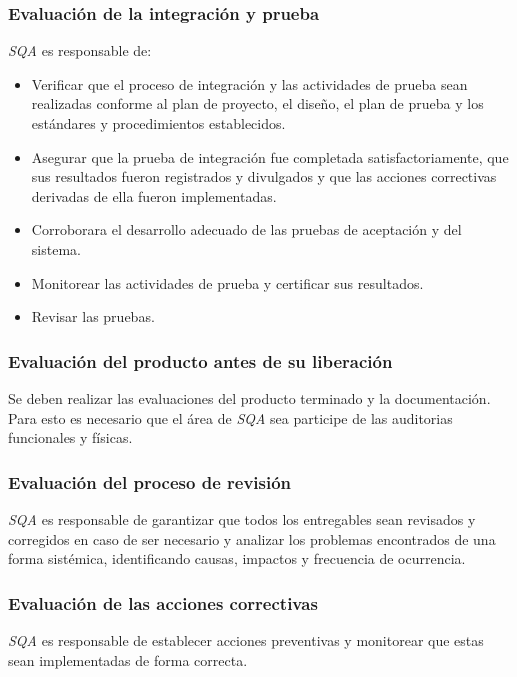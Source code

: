 \subsubsection{Evaluación de la integración y prueba}

\emph{SQA} es responsable de:

	\begin{itemize}
		\item 
		Verificar que el proceso de integración y las actividades de prueba sean realizadas conforme al plan de proyecto, el diseño, el plan de prueba y los estándares y procedimientos establecidos.
		\item
		Asegurar que la prueba de integración fue completada satisfactoriamente, que sus resultados fueron registrados y divulgados y que las acciones correctivas derivadas de ella fueron implementadas.
		\item	
		Corroborara el desarrollo adecuado de las pruebas de aceptación y del sistema.
		\item
		Monitorear las actividades de prueba y certificar sus resultados.
		\item
		Revisar las pruebas.
	\end{itemize}

\subsubsection{Evaluación del producto antes de su liberación}

Se deben realizar las evaluaciones del producto terminado y la documentación. Para esto es necesario que el área de \emph{SQA} sea participe de las auditorias funcionales y físicas. 

\subsubsection{Evaluación del proceso de revisión}

\emph{SQA} es responsable de garantizar que todos los entregables sean revisados y corregidos en caso de ser necesario y analizar los problemas encontrados de una forma sistémica, identificando causas, impactos y frecuencia de ocurrencia.

\subsubsection{Evaluación de las acciones correctivas}

\emph{SQA} es responsable de establecer acciones preventivas y monitorear que estas sean implementadas de forma correcta. 

